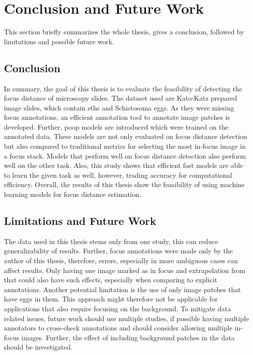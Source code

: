 \chapter{Conclusion and Future Work}
\label{ch:Conclusion}

This section briefly summarizes the whole thesis, gives a conclusion, followed by limitations and possible future work.

\section{Conclusion}
\label{sec:Conclusion:Conclusion}

In summary, the goal of this thesis is to evaluate the feasibility of detecting the focus distance of microscopy slides. The dataset used are Kato-Katz prepared image slides, which contain \aclp{sth} and Schistosoma eggs. As they were missing focus annotations, an efficient annotation tool to annotate image patches is developed. Further, \ac{poop} models are introduced which were trained on the annotated data. These models are not only evaluated on focus distance detection but also compared to traditional metrics for selecting the most in-focus image in a focus stack. Models that perform well on focus distance detection also perform well on the other task. Also, this study shows that efficient fast models are able to learn the given task as well, however, trading accuracy for computational efficiency.
Overall, the results of this thesis show the feasibility of using machine learning models for focus distance estimation.


\section{Limitations and Future Work}
\label{sec:Conclusion:FutureWork}

The data used in this thesis stems only from one study, this can reduce generalizability of results. Further, focus annotations were made only by the author of this thesis, therefore, errors, especially in more ambiguous cases can affect results. Only having one image marked as in focus and extrapolation from that could also have such effects, especially when comparing to explicit annotations. Another potential limitation is the use of only image patches that have eggs in them. This approach might therefore not be applicable for applications that also require focusing on the background. 
To mitigate data related issues, future work should use multiple studies, if possible having multiple annotators to cross-check annotations and should consider allowing multiple in-focus images. Further, the effect of including background patches in the data should be investigated.

